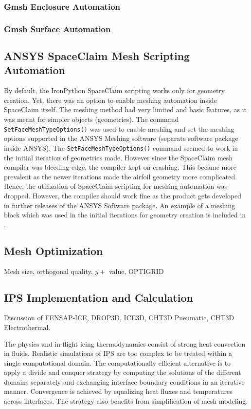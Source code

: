 \documentclass[english]{kththesis}
\begin{document}
\subsubsection{Gmsh Enclosure Automation}
\subsubsection{Gmsh Surface Automation}
\subsection{ANSYS SpaceClaim Mesh Scripting Automation}
By default, the IronPython SpaceClaim scripting works only for geometry creation. Yet, there was an option to enable meshing automation inside SpaceClaim itself. The meshing method had very limited and basic features, as it was meant for simpler objects (geometries). The command \lstinline{SetFaceMeshTypeOptions()} was used to enable meshing and set the meshing options supported in the ANSYS Meshing software (separate software package inside ANSYS). The \lstinline{SetFaceMeshTypeOptions()} command seemed to work in the initial iteration of geometries made. However since the SpaceClaim mesh compiler was bleeding-edge, the compiler kept on crashing. This became more prevalent as the newer iterations made the airfoil geometry more complicated. Hence, the utilization of SpaceClaim scripting for meshing automation was dropped. However, the compiler should work fine as the product gets developed in further releases of the ANSYS Software package. An example of a meshing block which was used in the initial iterations for geometry creation is included in . 

\subsection{Mesh Optimization} Mesh size, orthogonal quality, $y+$ value, OPTIGRID

\subsection{IPS Implementation and Calculation}
Discussion of FENSAP-ICE, DROP3D, ICE3D, CHT3D Pneumatic, CHT3D Electrothermal.

The physics and in-flight icing thermodynamics consist of strong heat convection in fluids. Realistic simulations of IPS are too complex to be treated within a single computational domain. The computationally efficient alternative is to apply a divide and conquer strategy by computing the solutions of the different domains separately and exchanging interface boundary conditions in an iterative manner. Convergence is achieved by equalizing heat fluxes and temperatures across interfaces. The strategy also benefits from simplification of mesh modeling.
\cleardoublepage
\end{document}
